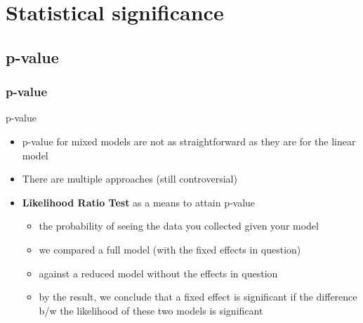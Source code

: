 \documentclass[10p]{beamer}\usepackage[]{graphicx}\usepackage[]{color}
\begin{document}
\section[Significance]{Statistical significance}
\subsection{p-value}
\begin{frame}
\frametitle{p-value}
p-value
\begin{itemize}
\item p-value for mixed models are not as straightforward as they are for the linear model
\item There are multiple approaches (still controversial)
\item \textbf{Likelihood Ratio Test} as a means to attain p-value
	\begin{itemize}
	\item the probability of seeing the data you collected given your model
	\item we compared a full model (with the fixed effects in question)
	\item against a reduced model without the effects in question
	\item by the result, we conclude that a fixed effect is significant if the difference b/w the likelihood of these two models is significant
	\end{itemize}
\end{itemize}
\end{frame}
\end{document}
